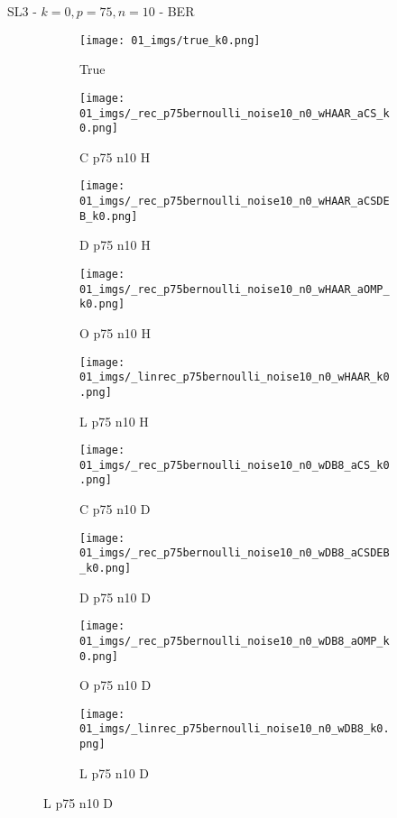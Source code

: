 \begin{frame}{SL3 - $k=0,p=75,n=10$ - BER}{}
\begin{figure}
\begin{subfigure}{0.1\textwidth}
\texttt{[image: 01\_imgs/true\_k0.png]}
\caption*{\Tiny True}
\end{subfigure}
\begin{subfigure}{0.1\textwidth}
\texttt{[image: 01\_imgs/\_rec\_p75bernoulli\_noise10\_n0\_wHAAR\_aCS\_k0.png]}
\caption*{\Tiny C p75 n10 H}
\end{subfigure}
\begin{subfigure}{0.1\textwidth}
\texttt{[image: 01\_imgs/\_rec\_p75bernoulli\_noise10\_n0\_wHAAR\_aCSDEB\_k0.png]}
\caption*{\Tiny D p75 n10 H}
\end{subfigure}
\begin{subfigure}{0.1\textwidth}
\texttt{[image: 01\_imgs/\_rec\_p75bernoulli\_noise10\_n0\_wHAAR\_aOMP\_k0.png]}
\caption*{\Tiny O p75 n10 H}
\end{subfigure}
\begin{subfigure}{0.1\textwidth}
\texttt{[image: 01\_imgs/\_linrec\_p75bernoulli\_noise10\_n0\_wHAAR\_k0.png]}
\caption*{\Tiny L p75 n10 H}
\end{subfigure}
\begin{subfigure}{0.1\textwidth}
\texttt{[image: 01\_imgs/\_rec\_p75bernoulli\_noise10\_n0\_wDB8\_aCS\_k0.png]}
\caption*{\Tiny C p75 n10 D}
\end{subfigure}
\begin{subfigure}{0.1\textwidth}
\texttt{[image: 01\_imgs/\_rec\_p75bernoulli\_noise10\_n0\_wDB8\_aCSDEB\_k0.png]}
\caption*{\Tiny D p75 n10 D}
\end{subfigure}
\begin{subfigure}{0.1\textwidth}
\texttt{[image: 01\_imgs/\_rec\_p75bernoulli\_noise10\_n0\_wDB8\_aOMP\_k0.png]}
\caption*{\Tiny O p75 n10 D}
\end{subfigure}
\begin{subfigure}{0.1\textwidth}
\texttt{[image: 01\_imgs/\_linrec\_p75bernoulli\_noise10\_n0\_wDB8\_k0.png]}
\caption*{\Tiny L p75 n10 D}
\end{subfigure}
\end{figure}
\end{frame}


